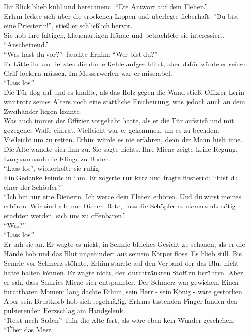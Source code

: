 Ihr Blick blieb kühl und berechnend. ``Die Antwort auf dein Flehen.''\\
Erhim leckte sich über die trockenen Lippen und überlegte fieberhaft. ``Du bist eine Priesterin!'', 
stieß er schließlich hervor.\\
Sie hob ihre faltigen, klauenartigen Hände und betrachtete sie interessiert. ``Anscheinend.''\\
``Was hast du vor?'', fauchte Erhim: ``Wer bist du?''\\
Er hätte ihr am liebsten die dürre Kehle aufgeschlitzt, aber dafür würde er seinen Griff lockern 
müssen. Im Messerwerfen war er miserabel.\\
``Lass los.''\\
Die Tür flog auf und es knallte, als das Holz gegen die Wand stieß. Offizier Lerin war trotz seines 
Alters noch eine stattliche Erscheinung, was jedoch auch an dem Zweihänder liegen könnte.\\
Was auch immer der Offizier vorgehabt hatte, als er die Tür aufstieß und mit gezogener Waffe 
eintrat. Vielleicht war er gekommen, um es zu beenden. Vielleicht um zu retten. Erhim würde es nie 
erfahren, denn der Mann hielt inne. Die Alte wandte sich ihm zu. Sie sagte nichts. Ihre Miene zeigte 
keine Regung. Langsam sank die Klinge zu Boden.\\
``Lass los'', wiederholte sie ruhig.\\
Ein Gedanke keimte in ihm. Er zögerte nur kurz und fragte flüsternd: ``Bist du einer der 
Schöpfer?''\\
``Ich bin nur eine Dienerin. Ich werde dein Flehen erhören. Und du wirst meines erhören. Wir sind 
alle nur Diener. Bete, dass die Schöpfer es niemals als nötig erachten werden, sich uns zu 
offenbaren.''\\
``Was?''\\
``Lass los.''\\
Er sah sie an. Er wagte es nicht, in Semric bleiches Gesicht zu schauen, als er die Hände hob und 
das Blut ungehindert aus seinem Körper floss. Es blieb still. Bis Semric vor Schmerz stöhnte. 
Erhim starrte auf den Verband der das Blut nicht hatte halten können. Er wagte nicht, den 
durchtränkten Stoff zu berühren. Aber er sah, dass Semrics Miene sich entspannter. Der Schmerz war 
gewichen. Einen furchtbaren Moment lang dachte Erhim, sein Herr - sein König - wäre gestorben. Aber 
sein Brustkorb hob sich regelmäßig. Erhims tastenden Finger fanden den pulsierenden Herzschlag am Handgelenk.\\
``Reist nach Süden'', fuhr die Alte fort, als wäre eben kein Wunder geschehen: ``Über das Meer. 
